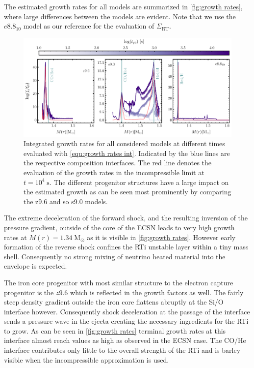 \documentclass[fleqn,usenatbib]{mnras}
\begin{document}
The estimated growth rates for all models are summarized in \autoref{fig:growth rates}, where large differences between the models are evident. Note that we use the $e8.8_{10}$ model as our reference for the evaluation of $\Sigma_{\mathrm{RT}}$.


\begin{figure}
 \centering
 \includegraphics[width=\textwidth]{pic/growth_rates_1d.pdf}
 \caption{Integrated growth rates for all considered models at different times evaluated with \autoref{equ:growth rates int}. Indicated by the blue lines are the respective composition interfaces. The red line denotes the evaluation of the growth rates in the incompressible limit at $t=10^{4}\;\mathrm{s}$. The different progenitor structures have a large impact on the estimated growth as can be seen most prominently by comparing the z9.6 and so s9.0 models. }
 \label{fig:growth rates}
\end{figure}

The extreme deceleration of the forward shock, and the resulting inversion of the pressure gradient, outside of the core of the ECSN leads to very high growth rates at $M(r)=1.34\;\mathrm{M_{\odot}}$ as it is visible in \autoref{fig:growth rates}. However early formation of the reverse shock confines the RTi unstable layer within a tiny mass shell. Consequently no strong mixing of  neutrino heated material into the envelope is expected.

The iron core progenitor with most similar structure to the electron capture progenitor is the $z9.6$ which is reflected in the growth factors as well.
The fairly steep density gradient outside the iron core flattens abruptly at the Si/O interface however. Consequently shock deceleration at the passage of the interface sends a pressure wave in the ejecta creating the necessary ingredients for the RTi to grow. As can be seen in \autoref{fig:growth rates} terminal growth rates at this interface almost reach values as high as observed in the ECSN case. The CO/He interface contributes only little to the overall strength of the RTi and is barley visible when the incompressible approximation is used.
\end{document}
